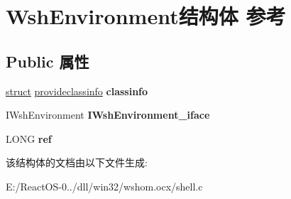 \hypertarget{struct_wsh_environment}{}\section{Wsh\+Environment结构体 参考}
\label{struct_wsh_environment}
\subsection*{Public 属性}
\begin{DoxyCompactItemize}
\item 
\mbox{\label{struct_wsh_environment_a41ba053d9f6e8d70beaa755222b0eb7a}} 
\hyperlink{interfacestruct}{struct} \hyperlink{structprovideclassinfo}{provideclassinfo} {\bfseries classinfo}
\item 
\mbox{\label{struct_wsh_environment_af6ac48de41cd2333d72b1d0a5920f2d2}} 
I\+Wsh\+Environment {\bfseries I\+Wsh\+Environment\+\_\+iface}
\item 
\mbox{\label{struct_wsh_environment_a30e58586c5e97df73845b3af229b0118}} 
L\+O\+NG {\bfseries ref}
\end{DoxyCompactItemize}


该结构体的文档由以下文件生成\+:\begin{DoxyCompactItemize}
\item 
E\+:/\+React\+O\+S-\/0../dll/win32/wshom.\+ocx/shell.\+c\end{DoxyCompactItemize}
